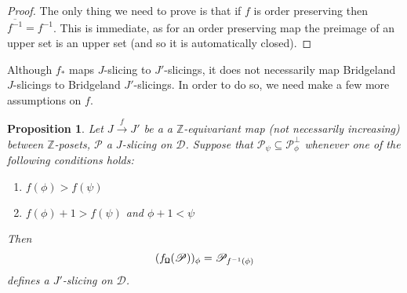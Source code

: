 \documentclass{article}
\newtheorem{prop}[thm]{Proposition}
\theoremstyle{definition}
\begin{document}
\begin{proof}
The only thing we need to prove is that if $f$ is order preserving then $\overline{f^{-1}}=f^{-1}$. This is immediate, as for an order preserving map the preimage of an upper set is an upper set (and so it is automatically closed). 
\end{proof}
Although $f_*$ maps $J$-slicing to $J'$-slicings, it does not necessarily map Bridgeland $J$-slicings to Bridgeland $J'$-slicings. In order to do so, we need make a few more assumptions on $f$.

\begin{prop}\label{pipp}
Let $J \overset{f}{\longrightarrow} J'$ be a a $\mathbb{Z}$-equivariant map (not necessarily increasing) between $\mathbb{Z}$-posets, $\mathscr{P}$ a $J$-slicing on $\mathscr{D}$. Suppose that $\mathscr{P}_{\psi} \subseteq \mathscr{P}_{\phi}^{\perp}$ whenever one of the following conditions holds: 
\begin{enumerate}[label=(\alph*)]
\item $f(\phi) > f(\psi)$
\item $f(\phi) + 1 > f(\psi)$ and $\phi +1 < \psi$
\end{enumerate}
Then $$(f_{\textnormal{\Libra}}(\mathscr{P}))_{\phi}=\mathscr{P}_{f^{-1}(\phi)}$$
defines a $J'$-slicing on $\mathscr{D}$.
\end{prop}
\end{document}

